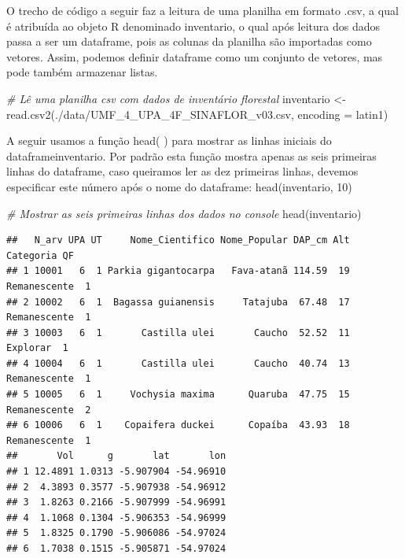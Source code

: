 \documentclass[
]{article}
\newenvironment{Shaded}{\begin{snugshade}}{\end{snugshade}}
\newcommand{\AttributeTok}[1]{\textcolor[rgb]{0.77,0.63,0.00}{#1}}
\newcommand{\CommentTok}[1]{\textcolor[rgb]{0.56,0.35,0.01}{\textit{#1}}}
\newcommand{\FunctionTok}[1]{\textcolor[rgb]{0.00,0.00,0.00}{#1}}
\newcommand{\NormalTok}[1]{#1}
\newcommand{\OtherTok}[1]{\textcolor[rgb]{0.56,0.35,0.01}{#1}}
\newcommand{\StringTok}[1]{\textcolor[rgb]{0.31,0.60,0.02}{#1}}
\begin{document}
O trecho de código a seguir faz a leitura de uma planilha em formato
.csv, a qual é atribuída ao objeto R denominado inventario, o qual após
leitura dos dados passa a ser um dataframe, pois as colunas da planilha
são importadas como vetores. Assim, podemos definir dataframe como um
conjunto de vetores, mas pode também armazenar listas.

\begin{Shaded}
\begin{Highlighting}[]
\CommentTok{\# Lê uma planilha csv com dados de inventário florestal}
\NormalTok{inventario }\OtherTok{\textless{}{-}} \FunctionTok{read.csv2}\NormalTok{(}\StringTok{\textquotesingle{}./data/UMF\_4\_UPA\_4F\_SINAFLOR\_v03.csv\textquotesingle{}}\NormalTok{,}
                \AttributeTok{encoding =} \StringTok{\textquotesingle{}latin1\textquotesingle{}}\NormalTok{)}
\end{Highlighting}
\end{Shaded}

A seguir usamos a função head( ) para mostrar as linhas iniciais do
dataframeinventario. Por padrão esta função mostra apenas as seis
primeiras linhas do dataframe, caso queiramos ler as dez primeiras
linhas, devemos especificar este número após o nome do dataframe:
head(inventario, 10)

\begin{Shaded}
\begin{Highlighting}[]
\CommentTok{\# Mostrar as seis primeiras linhas dos dados no console}
\FunctionTok{head}\NormalTok{(inventario)}
\end{Highlighting}
\end{Shaded}

\begin{verbatim}
##   N_arv UPA UT     Nome_Cientifico Nome_Popular DAP_cm Alt    Categoria QF
## 1 10001   6  1 Parkia gigantocarpa   Fava-atanã 114.59  19 Remanescente  1
## 2 10002   6  1  Bagassa guianensis     Tatajuba  67.48  17 Remanescente  1
## 3 10003   6  1       Castilla ulei       Caucho  52.52  11     Explorar  1
## 4 10004   6  1       Castilla ulei       Caucho  40.74  13 Remanescente  1
## 5 10005   6  1     Vochysia maxima      Quaruba  47.75  15 Remanescente  2
## 6 10006   6  1    Copaifera duckei      Copaíba  43.93  18 Remanescente  1
##       Vol      g       lat       lon
## 1 12.4891 1.0313 -5.907904 -54.96910
## 2  4.3893 0.3577 -5.907938 -54.96912
## 3  1.8263 0.2166 -5.907999 -54.96991
## 4  1.1068 0.1304 -5.906353 -54.96999
## 5  1.8325 0.1790 -5.906086 -54.97024
## 6  1.7038 0.1515 -5.905871 -54.97024
\end{verbatim}
\end{document}
